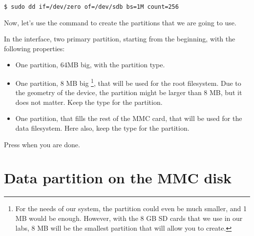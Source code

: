 \begin{verbatim}
$ sudo dd if=/dev/zero of=/dev/sdb bs=1M count=256
\end{verbatim}

Now, let's use the  command to create the partitions that
we are going to use.

In the  interface, two primary partition,
starting from the beginning, with the following properties:

\begin{itemize}

\item One partition, 64MB big, with the  partition type.

\item One partition, 8 MB big
  \footnote{For the needs of our system, the partition could even be
  much smaller, and 1 MB would be enough. However, with the 8 GB SD
  cards that we use in our labs, 8 MB will be the smallest partition
  that  will allow you to create.},
  that will be used for the root
  filesystem. Due to the geometry of the device, the partition might
  be larger than 8 MB, but it does not matter. Keep the 
  type for the partition.

\item One partition, that fills the rest of the MMC card, that will be
  used for the data filesystem. Here also, keep the  type
  for the partition.

\end{itemize}

Press  when you are done.

\section{Data partition on the MMC disk}


